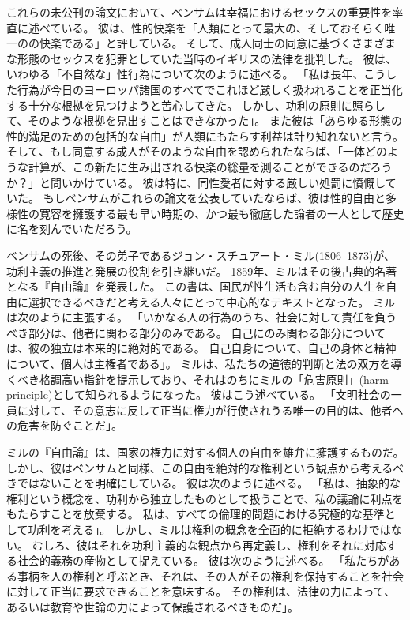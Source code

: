 \documentclass[paper=a4,book,openany]{jlreq}
\begin{document}
これらの未公刊の論文において、ベンサムは幸福におけるセックスの重要性を率直に述べている。
彼は、性的快楽を「人類にとって最大の、そしておそらく唯一のの快楽である」と評している。
そして、成人同士の同意に基づくさまざまな形態のセックスを犯罪としていた当時のイギリスの法律を批判した。
彼は、いわゆる「不自然な」性行為について次のように述べる。
「私は長年、こうした行為が今日のヨーロッパ諸国のすべてでこれほど厳しく扱われることを正当化する十分な根拠を見つけようと苦心してきた。
しかし、功利の原則に照らして、そのような根拠を見出すことはできなかった」。
また彼は「あらゆる形態の性的満足のための包括的な自由」が人類にもたらす利益は計り知れないと言う。
そして、もし同意する成人がそのような自由を認められたならば、「一体どのような計算が、この新たに生み出される快楽の総量を測ることができるのだろうか？」と問いかけている。
彼は特に、同性愛者に対する厳しい処罰に憤慨していた。
もしベンサムがこれらの論文を公表していたならば、彼は性的自由と多様性の寛容を擁護する最も早い時期の、かつ最も徹底した論者の一人として歴史に名を刻んでいただろう。

ベンサムの死後、その弟子であるジョン・スチュアート・ミル(1806--1873)が、功利主義の推進と発展の役割を引き継いだ。
1859年、ミルはその後古典的名著となる『自由論』を発表した。
この書は、国民が性生活も含む自分の人生を自由に選択できるべきだと考える人々にとって中心的なテキストとなった。
ミルは次のように主張する。
「いかなる人の行為のうち、社会に対して責任を負うべき部分は、他者に関わる部分のみである。
自己にのみ関わる部分については、彼の独立は本来的に絶対的である。
自己自身について、自己の身体と精神について、個人は主権者である」\citep[p.13]{mill15:_liber_utilit_other_essay}。
ミルは、私たちの道徳的判断と法の双方を導くべき格調高い指針を提示しており、それはのちにミルの「危害原則」(harm principle)として知られるようになった。
彼はこう述べている。
「文明社会の一員に対して、その意志に反して正当に権力が行使されうる唯一の目的は、他者への危害を防ぐことだ」\citep[p.13]{mill15:_liber_utilit_other_essay}。

ミルの『自由論』は、国家の権力に対する個人の自由を雄弁に擁護するものだ。
しかし、彼はベンサムと同様、この自由を絶対的な権利という観点から考えるべきではないことを明確にしている。
彼は次のように述べる。
「私は、抽象的な権利という概念を、功利から独立したものとして扱うことで、私の議論に利点をもたらすことを放棄する。
私は、すべての倫理的問題における究極的な基準として功利を考える」\citep[p.14]{mill15:_liber_utilit_other_essay}。
しかし、ミルは権利の概念を全面的に拒絶するわけではない。
むしろ、彼はそれを功利主義的な観点から再定義し、権利をそれに対応する社会的義務の産物として捉えている。
彼は次のように述べる。
「私たちがある事柄を人の権利と呼ぶとき、それは、その人がその権利を保持することを社会に対して正当に要求できることを意味する。
その権利は、法律の力によって、あるいは教育や世論の力によって保護されるべきものだ」\citep[p.166]{mill15:_liber_utilit_other_essay}。
\end{document}
